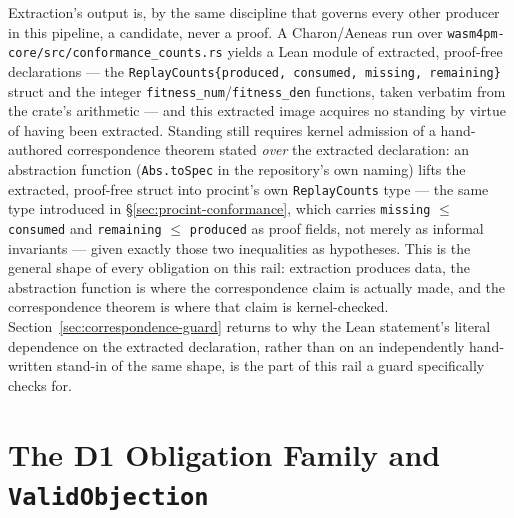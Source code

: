 Extraction's output is, by the same discipline that governs every other
producer in this pipeline, a candidate, never a proof. A Charon/Aeneas
run over \texttt{wasm4pm-core/src/conformance\_counts.rs} yields a Lean
module of extracted, proof-free declarations --- the
\texttt{ReplayCounts\{produced, consumed, missing, remaining\}} struct and
the integer \texttt{fitness\_num}/\texttt{fitness\_den} functions, taken
verbatim from the crate's arithmetic --- and this extracted image
acquires no standing by virtue of having been extracted. Standing still
requires kernel admission of a hand-authored correspondence theorem
stated \emph{over} the extracted declaration: an abstraction function
(\texttt{Abs.toSpec} in the repository's own naming) lifts the extracted,
proof-free struct into \textsf{procint}'s own \texttt{ReplayCounts} type
--- the same type introduced in \S\ref{sec:procint-conformance}, which
carries \texttt{missing} \(\le\) \texttt{consumed} and \texttt{remaining}
\(\le\) \texttt{produced} as proof fields, not merely as informal
invariants --- given exactly those two inequalities as hypotheses. This
is the general shape of every obligation on this rail: extraction
produces data, the abstraction function is where the correspondence claim
is actually made, and the correspondence theorem is where that claim is
kernel-checked. Section~\ref{sec:correspondence-guard} returns to why the
Lean statement's literal dependence on the extracted declaration, rather
than on an independently hand-written stand-in of the same shape, is the
part of this rail a guard specifically checks for.

\section{The D1 Obligation Family and \texttt{ValidObjection}}
\label{sec:correspondence-d1}

